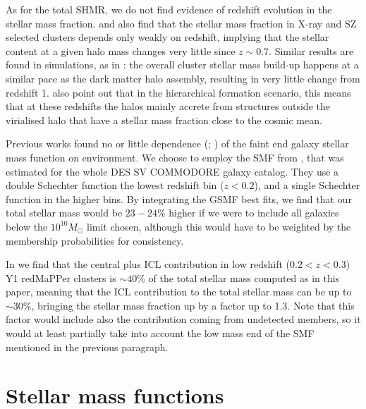 {As for the total SHMR, we do not find evidence of redshift evolution in the stellar mass fraction. \citet{chiu16} and \citet{chiu17} also find that the stellar mass fraction in X-ray and SZ selected clusters depends only weakly on redshift, implying that the stellar content at a given halo mass changes very little since $z\sim 0.7$. Similar results are found in simulations, as in \citet{illustris}: the overall cluster stellar mass build-up happens at a similar pace as the dark matter halo assembly, resulting in very little change from redshift 1. \citet{chiu17} also point out that in the hierarchical formation scenario, this means that at these redshifts the halos mainly accrete from structures outside the virialised halo that have a stellar mass fraction close to the cosmic mean. 

Previous works found no or little dependence (\citealt{vulcani}; \citealt{etherington}) of the faint end galaxy stellar mass function on environment. We choose to employ the SMF from \citet{capozzi}, that was estimated for the whole DES SV COMMODORE galaxy catalog. They use a double Schechter function \citep{Schechter} the lowest redshift bin ($z<0.2$), and a single Schechter function in the higher bins. By integrating the GSMF best fits, we find that our total stellar mass would be $23-24\%$ higher if we were to include all galaxies below the $10^{10}M_\odot$ limit chosen, although this would have to be weighted by the membership probabilities for consistency.

In \citet{icl} we find that the central plus ICL contribution in low redshift ($0.2<z<0.3$) Y1 redMaPPer clusters is $\sim 40\%$ of the total stellar mass computed as in this paper, meaning that the ICL contribution to the total stellar mass can be up to $\sim 30\%$, bringing the stellar mass fraction up by a factor up to 1.3. Note that this factor would include also the contribution coming from undetected members, so it would at least partially take into account the low mass end of the SMF mentioned in the previous paragraph.



\section{Stellar mass functions}\label{sec:smf}

}
